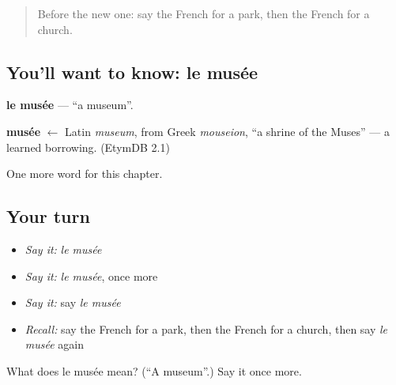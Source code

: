\begin{quote}
Before the new one: say the French for a park, then the French for a church.
\end{quote}

\subsection*{You'll want to know: le musée}
\textbf{le musée} — \textquotedblleft{}a museum\textquotedblright{}.

\begin{cousinweb}
\textbf{musée} $\leftarrow$ Latin \emph{museum}, from Greek \emph{mouseion}, \textquotedblleft{}a shrine of the Muses\textquotedblright{} — a learned borrowing. (EtymDB 2.1)
\end{cousinweb}

\begin{grammarlens}[title={What you've built}]
One more word for this chapter.
\end{grammarlens}

\subsection*{Your turn}
\begin{itemize}
\raggedright
  \item \emph{Say it:} \emph{le musée}
  \item \emph{Say it:} \emph{le musée}, once more
  \item \emph{Say it:} say \emph{le musée}
  \item \emph{Recall:} say the French for a park, then the French for a church, then say \emph{le musée} again
\end{itemize}

\begin{tcolorbox}[breakable,colback=teal!4,colframe=teal!35!black,title={Before you move on}]
What does le musée mean? (\textquotedblleft{}A museum\textquotedblright{}.) Say it once more.
\end{tcolorbox}
